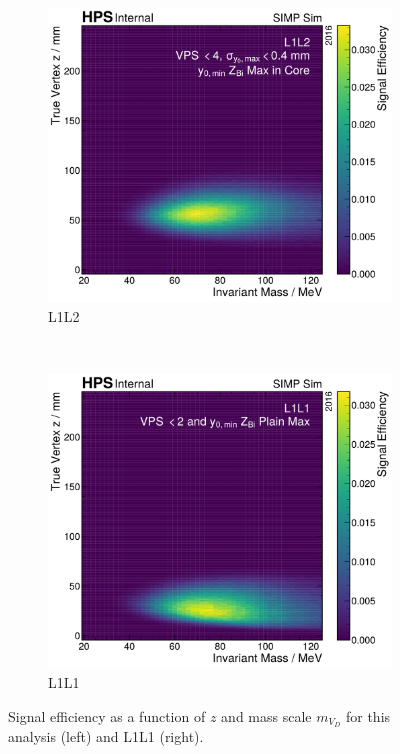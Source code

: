 \begin{figure}
  \centering
  \begin{subfigure}{0.48\textwidth}
    \centering
    \includegraphics[width=\textwidth]{figures/hps/analysis/results/signal-efficiency.pdf}
    \caption{L1L2}
    \label{fig:signal-efficiency:l1l2}
  \end{subfigure}
  ~
  \begin{subfigure}{0.48\textwidth}
    \centering
    \includegraphics[width=\textwidth]{figures/hps/analysis/results/l1l1-signal-efficiency.pdf}
    \caption{L1L1}
    \label{fig:signal-efficiency:l1l1}
  \end{subfigure}
  \caption{Signal efficiency as a function of $z$ and mass scale $m_{V_D}$ for
  this analysis (left) and L1L1 (right).}
  \label{fig:signal-efficiency}
\end{figure}

